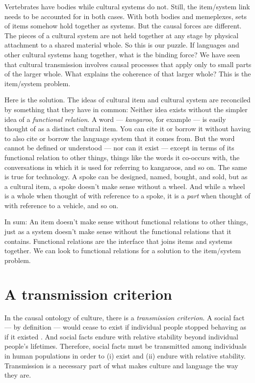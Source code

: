 Vertebrates have bodies while cultural systems 
do not. Still, the item/system link needs to be accounted for in both cases. With both bodies and memeplexes, sets of items somehow hold together as systems. But the causal forces are different. The pieces of a cultural system are not held together at any stage by physical 
attachment to a shared material whole. So this is our puzzle. If 
languages and other cultural systems hang together, what is the 
binding force? We have seen that cultural transmission involves causal processes that 
apply only to small parts of the larger whole. What explains the 
coherence of that larger whole? This is the item/system problem.



Here is the solution. The ideas of cultural item and cultural system are reconciled by something that they have in 
common: Neither idea exists without the simpler idea of a \textit{functional relation}. A word --- \textit{kangaroo}, for example --- is easily thought of as a 
distinct cultural item. You can cite it or borrow it without having to 
also cite or borrow the language system that it comes from. But the word 
cannot be defined or understood --- nor can it exist --- except in terms of its 
functional relation to other things, things like the words it co-occurs 
with, the conversations in which it is used for referring to kangaroos, 
and so on. The same is true for technology. A spoke can be designed, named, bought, and sold, 
but as a cultural item, a spoke doesn't make sense without a wheel. And 
while a wheel is a whole when thought of with reference to a spoke, it 
is a \textit{part} when thought of with reference to a vehicle, and so 
on. 



In sum: An item doesn't make sense without functional relations to other 
things, just as a system doesn't make sense without the functional 
relations that it contains. Functional relations are the interface that 
joins items and systems together. We can look to functional relations for a solution 
to the item/system problem.

\section{A transmission criterion}

In the causal ontology of culture, there is a \textit{transmission 
criterion}. A social fact --- by definition --- would cease to exist if 
individual people stopped behaving as if it existed \citep{searle_making_2010}. And social facts 
endure with relative stability beyond individual people's lifetimes. Therefore, social facts must be transmitted among individuals in human 
populations in order to (i) exist and (ii) endure with relative 
stability. Transmission is a necessary part of what makes culture and 
language the way they are. 



